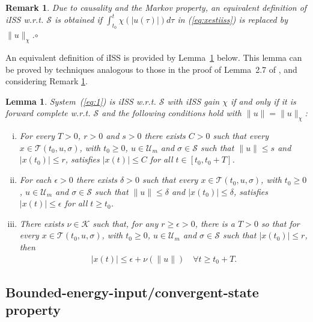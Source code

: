 \documentclass[9pt,final,journal]{IEEEtran}
\newtheorem{lema}{Lemma}
\newtheorem{remark}{Remark}
\def\K{\mathcal{K}}
\def\S{\mathcal{S}}
\def\T{\mathcal{T}}
\def\U{\mathcal{U}}
\def\mer{\hfill $\circ$}
\begin{document}
\begin{remark} 
\label{rem:iiss-norm}
  Due to causality and the Markov property, an equivalent definition of iISS w.r.t. $\S$ is obtained if $\int_{t_0}^t \chi(|u(\tau)|) d\tau$ in 
(\ref{eq:xestiiss}) is replaced by $\|u\|_{\chi}$.\mer
\end{remark}

An equivalent definition of iISS is provided by Lemma~\ref{rem:iiss-charact} below. This lemma can be proved by techniques analogous to those in the proof of Lemma~2.7 of \cite{sonwan_scl95}, and considering Remark \ref{rem:iiss-norm}.
\begin{lema}
  \label{rem:iiss-charact}
 System~(\ref{eq:1}) is iISS w.r.t. $\S$ with iISS gain $\chi$ if and only if it is forward complete w.r.t. $\S$ and the following conditions hold with $\|u\|=\|u\|_{\chi}$:
    \begin{enumerate}[i)]
    \item For every $T>0$, $r>0$ and $s>0$ there exists $C>0$ such that every  
    $x\in \T(t_0,u,\sigma)$, with $t_0\ge 0$, $u\in \U_m$ and $\sigma\in \S$ such that $\|u\|\le s$ and $|x(t_0)|\le r$,  
    satisfies $|x(t)|\le C$ for all $t\in [t_0, t_0+T]$. \label{item:bound-iss}
\item For each $\epsilon>0$ there exists $\delta>0$ such that every $x\in \T(t_0,u,\sigma)$, with $t_0\ge 0$, $u\in \U_m$ and $\sigma\in \S$ such that 
$\|u\|\le \delta$ and $|x(t_0)|\le \delta$, 
    satisfies $|x(t)|\le\epsilon$ for all $t\ge t_0$. \label{item:gs-iss}
\item There exists $\nu\in\K$ such that, for any
      $r\ge \epsilon>0$, there is a $T>0$ so that for every $x\in \T(t_0,u,\sigma)$, with $t_0\ge 0$, $u\in \U_m$ and $\sigma\in \S$ such that 
$|x(t_0)|\le r$, then\label{item:ua-iss}
      \begin{align*}
        |x(t)| \le \epsilon + \nu(\|u\|)\quad\forall t\ge t_0 + T.
      \end{align*}
    \end{enumerate}
\end{lema}
%
\subsection{Bounded-energy-input/convergent-state property}
\end{document}
